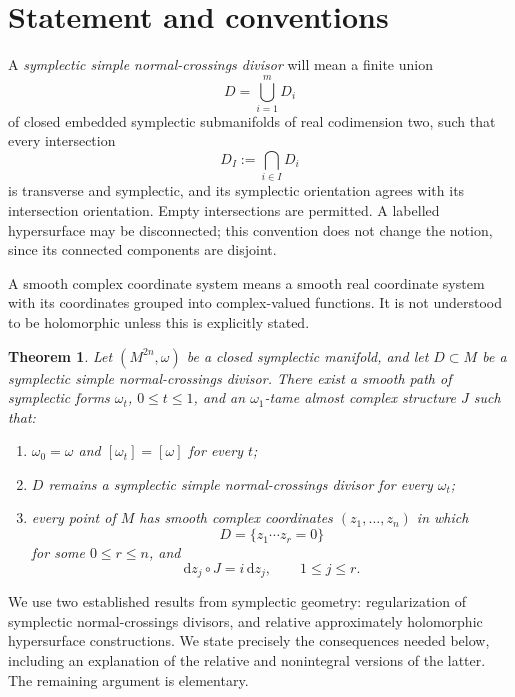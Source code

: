 \documentclass[11pt]{article}
\newtheorem{theorem}{Theorem}[section]
\theoremstyle{definition}
\theoremstyle{remark}
\newcommand{\dd}{\mathrm d}
\begin{document}
\section{Statement and conventions}

A \emph{symplectic simple normal-crossings divisor} will mean a finite
union
\[
D=\bigcup_{i=1}^{m}D_i
\]
of closed embedded symplectic submanifolds of real codimension two,
such that every intersection
\[
D_I:=\bigcap_{i\in I}D_i
\]
is transverse and symplectic, and its symplectic orientation agrees
with its intersection orientation.  Empty intersections are permitted.
A labelled hypersurface may be disconnected; this convention does not
change the notion, since its connected components are disjoint.

A smooth complex coordinate system means a smooth real coordinate
system with its coordinates grouped into complex-valued functions.
It is not understood to be holomorphic unless this is explicitly
stated.

\begin{theorem}\label{thm:main}
Let $(M^{2n},\omega)$ be a closed symplectic manifold, and let
$D\subset M$ be a symplectic simple normal-crossings divisor.
There exist a smooth path of symplectic forms $\omega_t$, $0\leq t\leq1$,
and an $\omega_1$-tame almost complex structure $J$ such that:
\begin{enumerate}[label=\textup{(\roman*)}]
\item $\omega_0=\omega$ and $[\omega_t]=[\omega]$ for every $t$;
\item $D$ remains a symplectic simple normal-crossings divisor for
      every $\omega_t$;
\item every point of $M$ has smooth complex coordinates
      $(z_1,\ldots,z_n)$ in which
      \[
      D=\{z_1\cdots z_r=0\}
      \]
      for some $0\leq r\leq n$, and
      \[
      \dd z_j\circ J=i\,\dd z_j,\qquad 1\leq j\leq r.
      \]
\end{enumerate}
\end{theorem}


We use two established results from symplectic geometry:
regularization of symplectic normal-crossings divisors, and relative
approximately holomorphic hypersurface constructions.  We state
precisely the consequences needed below, including an explanation of
the relative and nonintegral versions of the latter.  The remaining
argument is elementary.
\end{document}
